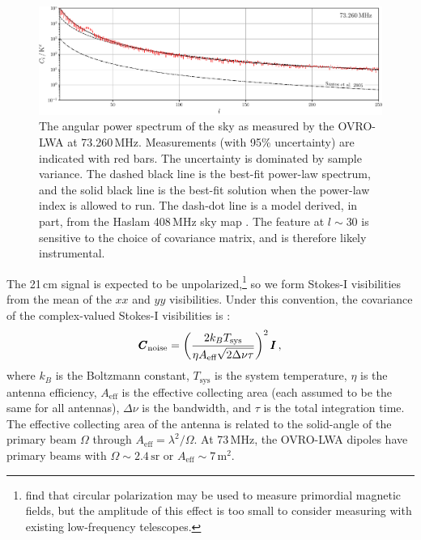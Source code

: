 \begin{bibunit}
\begin{figure}
    \centering
    \includegraphics[width=\textwidth]{figures/chapter4/foreground-covariance-06}
    \caption{
        The angular power spectrum of the sky as measured by the OVRO-LWA at 73.260\,MHz.
        Measurements (with 95\% uncertainty) are indicated with red bars. The uncertainty is
        dominated by sample variance. The dashed black line is the best-fit power-law spectrum, and
        the solid black line is the best-fit solution when the power-law index is allowed to run.
        The dash-dot line is a model derived, in part, from the Haslam 408\,MHz sky map
        \citep{1981A&A...100..209H, 1982A&AS...47....1H, 2005ApJ...625..575S}.  The feature at
        $l\sim30$ is sensitive to the choice of covariance matrix, and is therefore likely
        instrumental.
    }
    \label{fig:foreground-covariance}
\end{figure}

The 21\,cm signal is expected to be unpolarized,\footnote{
    \citet{2017PhRvD..95h3010V} find that circular polarization may be used to measure primordial
    magnetic fields, but the amplitude of this effect is too small to consider measuring with
    existing low-frequency telescopes.
} so we form
Stokes-I visibilities from the mean of the $xx$ and $yy$ visibilities. Under this convention, the
covariance of the complex-valued Stokes-I visibilities is \citep[Chapter 9]{1999ASPC..180.....T}:
\begin{equation}
    \pmb C_\text{noise}
        = \left(
            \frac{2 k_B T_\text{sys}}{\eta A_\text{eff} \sqrt{2\Delta\nu\tau}}
        \right)^2 \pmb I\,,
\end{equation}
where $k_B$ is the Boltzmann constant, $T_\text{sys}$ is the system temperature, $\eta$ is the
antenna efficiency, $A_\text{eff}$ is the effective collecting area (each assumed to be the same for
all antennas), $\Delta\nu$ is the bandwidth, and $\tau$ is the total integration time.  The
effective collecting area of the antenna is related to the solid-angle of the primary beam $\Omega$
through $A_\text{eff} = \lambda^2 / \Omega$. At 73\,MHz, the OVRO-LWA dipoles have primary beams
with $\Omega \sim 2.4\,\text{sr}$ or $A_\text{eff}\sim 7\,\text{m}^2$.


\end{bibunit}
